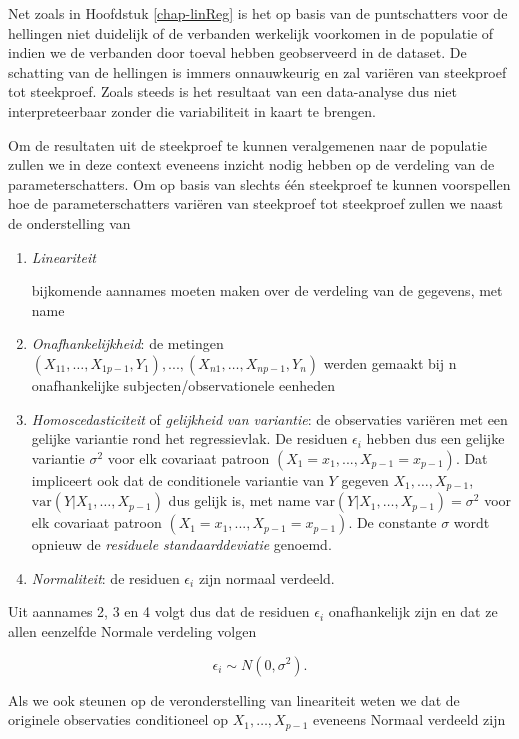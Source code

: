 \documentclass[
  12pt,dutch]{book}
\theoremstyle{definition}
\theoremstyle{definition}
\theoremstyle{definition}
\theoremstyle{definition}
\theoremstyle{remark}
\begin{document}
Net zoals in Hoofdstuk \ref{chap-linReg} is het op basis van de puntschatters voor de hellingen niet duidelijk of de verbanden werkelijk voorkomen in de populatie of indien we de verbanden door toeval hebben geobserveerd in de dataset.
De schatting van de hellingen is immers onnauwkeurig en zal variëren van steekproef tot steekproef.
Zoals steeds is het resultaat van een data-analyse dus niet interpreteerbaar zonder die variabiliteit in kaart te brengen.

Om de resultaten uit de steekproef te kunnen veralgemenen naar de populatie zullen we in deze context eveneens inzicht nodig hebben op de verdeling van de parameterschatters.
Om op basis van slechts één steekproef te kunnen voorspellen hoe de parameterschatters variëren van steekproef tot steekproef zullen we naast de onderstelling van

\begin{enumerate}
\def\labelenumi{\arabic{enumi}.}
\item
  \emph{Lineariteit}

  bijkomende aannames moeten maken over de verdeling van de gegevens, met name
\item
  \emph{Onafhankelijkheid}: de metingen \((X_{11},\dots, X_{1p-1}, Y_1), ...,  (X_{n1},\ldots,X_{np-1},Y_n)\) werden gemaakt bij n onafhankelijke subjecten/observationele eenheden
\item
  \emph{Homoscedasticiteit} of \emph{gelijkheid van variantie}: de observaties variëren met een gelijke variantie rond het regressievlak. De residuen \(\epsilon_i\) hebben dus een gelijke variantie \(\sigma^2\) voor elk covariaat patroon \((X_1=x_1, ..., X_{p-1}=x_{p-1})\). Dat impliceert ook dat de conditionele variantie van \(Y\) gegeven \(X_1,\ldots,X_{p-1}\), \(\text{var}(Y\vert X_1,\ldots,X_{p-1})\) dus gelijk is, met name \(\text{var}(Y\vert  X_1,\ldots,X_{p-1}) = \sigma^2\) voor elk covariaat patroon \((X_1=x_1, ..., X_{p-1}=x_{p-1})\). De constante \(\sigma\) wordt opnieuw de \emph{residuele standaarddeviatie} genoemd.
\item
  \emph{Normaliteit}: de residuen \(\epsilon_i\) zijn normaal verdeeld.
\end{enumerate}

Uit aannames 2, 3 en 4 volgt dus dat de residuen \(\epsilon_i\) onafhankelijk zijn en dat ze allen eenzelfde Normale verdeling volgen

\[\epsilon_i \sim N(0,\sigma^2).\]

Als we ook steunen op de veronderstelling van lineariteit weten we dat de originele observaties conditioneel op \(X_1,\ldots,X_{p-1}\) eveneens Normaal verdeeld zijn
\end{document}
